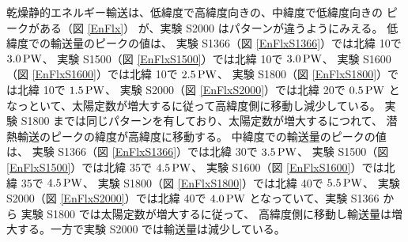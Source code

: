 \documentclass[body]{subfiles}
\begin{document}
乾燥静的エネルギー輸送は、低緯度で高緯度向きの、中緯度で低緯度向きの
ピークがある（図 \ref{EnFlx}）
が、実験 S2000 はパターンが違うようにみえる。
低緯度での輸送量のピークの値は、
実験 S1366（図 \ref{EnFlxS1366}）では北緯 10\textdegree で \(3.0\hmu{PW}\)、
実験 S1500（図 \ref{EnFlxS1500}）では北緯 10\textdegree で \(3.0\hmu{PW}\)、
実験 S1600（図 \ref{EnFlxS1600}）では北緯 10\textdegree で \(2.5\hmu{PW}\)、
実験 S1800（図 \ref{EnFlxS1800}）では北緯 10\textdegree で \(1.5\hmu{PW}\)、
実験 S2000（図 \ref{EnFlxS2000}）では北緯 20\textdegree で \(0.5\hmu{PW}\)
となっといて、太陽定数が増大するに従って高緯度側に移動し減少している。
実験 S1800 までは同じパターンを有しており、太陽定数が増大するにつれて、
潜熱輸送のピークの緯度が高緯度に移動する。
中緯度での輸送量のピークの値は、
実験 S1366（図 \ref{EnFlxS1366}）では北緯 30\textdegree で \(3.5\hmu{PW}\)、
実験 S1500（図 \ref{EnFlxS1500}）では北緯 35\textdegree で \(4.5\hmu{PW}\)、
実験 S1600（図 \ref{EnFlxS1600}）では北緯 35\textdegree で \(4.5\hmu{PW}\)、
実験 S1800（図 \ref{EnFlxS1800}）では北緯 40\textdegree で \(5.5\hmu{PW}\)、
実験 S2000（図 \ref{EnFlxS2000}）では北緯 40\textdegree で \(4.0\hmu{PW}\)
となっていて、実験 S1366 から 実験 S1800 では太陽定数が増大するに従って、
高緯度側に移動し輸送量は増大する。一方で実験 S2000 では輸送量は減少している。
\end{document}
